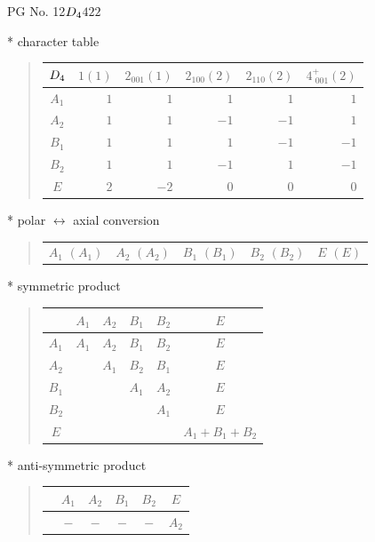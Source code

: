 \documentclass[fleqn,8pt,landscape]{jsarticle}
\begin{document}
\setcounter{MaxMatrixCols}{32}

\renewcommand{\tablename}{Table~}
\renewcommand{\figurename}{Figure~}
\begin{center}
\LARGE
PG No. 12\quad$D_{\rm 4}$\quad$422$\quad[ tetragonal ]
\end{center}

* character table
\begin{quote}
\begin{tabular}{crrrrr} \hline \hline
$ D_{\rm 4} $ & $ 1(1) $ & $ 2{}_{001}(1) $ & $ 2{}_{100}(2) $ & $ 2{}_{110}(2) $ & $ 4^{+}_{\,\,001}(2) $ \\ \hline
$ A_{1} $ & $ 1 $ & $ 1 $ & $ 1 $ & $ 1 $ & $ 1 $ \\
$ A_{2} $ & $ 1 $ & $ 1 $ & $ -1 $ & $ -1 $ & $ 1 $ \\
$ B_{1} $ & $ 1 $ & $ 1 $ & $ 1 $ & $ -1 $ & $ -1 $ \\
$ B_{2} $ & $ 1 $ & $ 1 $ & $ -1 $ & $ 1 $ & $ -1 $ \\
$ E $ & $ 2 $ & $ -2 $ & $ 0 $ & $ 0 $ & $ 0 $ \\
 \hline \hline
\end{tabular}
\end{quote}

* polar $\leftrightarrow$ axial conversion
\begin{quote}
\begin{tabular}{ccccc}
$ A_{1}\,\,(A_{1}) $ & $ A_{2}\,\,(A_{2}) $ & $ B_{1}\,\,(B_{1}) $ & $ B_{2}\,\,(B_{2}) $ & $ E\,\,(E) $
\end{tabular}
\end{quote}

* symmetric product
\begin{quote}
\begin{tabular}{c|ccccc} \hline \hline
 & $ A_{1} $ & $ A_{2} $ & $ B_{1} $ & $ B_{2} $ & $ E $ \\ \hline
$ A_{1} $ & $ A_{1} $ & $ A_{2} $ & $ B_{1} $ & $ B_{2} $ & $ E $ \\
$ A_{2} $ & $  $ & $ A_{1} $ & $ B_{2} $ & $ B_{1} $ & $ E $ \\
$ B_{1} $ & $  $ & $  $ & $ A_{1} $ & $ A_{2} $ & $ E $ \\
$ B_{2} $ & $  $ & $  $ & $  $ & $ A_{1} $ & $ E $ \\
$ E $ & $  $ & $  $ & $  $ & $  $ & $ A_{1} + B_{1} + B_{2} $ \\
 \hline \hline
\end{tabular}
\end{quote}

* anti-symmetric product
\begin{quote}
\begin{tabular}{cccccc} \hline \hline
 & $ A_{1} $ & $ A_{2} $ & $ B_{1} $ & $ B_{2} $ & $ E $ \\ \hline
$  $ & $ - $ & $ - $ & $ - $ & $ - $ & $ A_{2} $ \\
 \hline \hline
\end{tabular}
\end{quote}
\end{document}
